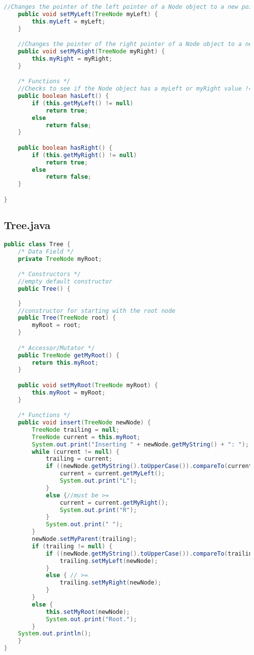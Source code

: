 \documentclass[letterpaper, 10pt,DIV=13]{scrartcl}
\numberwithin{equation}{section} %
\numberwithin{figure}{section} %
\numberwithin{table}{section} %
\begin{document}
\begin{lstlisting}[frame=single, language=java, breaklines]
    //Changes the pointer of the left pointer of a Node object to a new pointer to a node Object (or NULL)
    public void setMyLeft(TreeNode myLeft) {
        this.myLeft = myLeft;
    }

    //Changes the pointer of the right pointer of a Node object to a new pointer to a node Object (or NULL)
    public void setMyRight(TreeNode myRight) {
        this.myRight = myRight;
    }

    /* Functions */
    //Checks to see if the Node object has a myLeft or myRight value != null. Returns boolean depending on result.
    public boolean hasLeft() {
        if (this.getMyLeft() != null)
            return true;
        else
            return false;
    }

    public boolean hasRight() {
        if (this.getMyRight() != null)
            return true;
        else
            return false;
    }

}
\end{lstlisting}

\subsection{Tree.java}
\begin{lstlisting}[frame=single, language=java, breaklines]  
public class Tree {
    /* Data Field */
    private TreeNode myRoot;

    /* Constructors */
    //empty default constructor
    public Tree() {
        
    }
    //constructor for starting with the root node
    public Tree(TreeNode root) {
        myRoot = root;
    }

    /* Accessor/Mutator */
    public TreeNode getMyRoot() {
        return this.myRoot;
    }

    public void setMyRoot(TreeNode myRoot) {
        this.myRoot = myRoot;
    }

    /* Functions */
    public void insert(TreeNode newNode) {
        TreeNode trailing = null;
        TreeNode current = this.myRoot;
        System.out.print("Inserting " + newNode.getMyString() + ": ");
        while (current != null) {
            trailing = current;
            if ((newNode.getMyString().toUpperCase()).compareTo(current.getMyString().toUpperCase()) < 0) {
                current = current.getMyLeft();
                System.out.print("L");
            }
            else {//must be >=
                current = current.getMyRight();
                System.out.print("R");
            }
            System.out.print(" ");
        }
        newNode.setMyParent(trailing);
        if (trailing != null) {
            if ((newNode.getMyString().toUpperCase()).compareTo(trailing.getMyString().toUpperCase()) < 0) {
                trailing.setMyLeft(newNode);
            }
            else { // >=
                trailing.setMyRight(newNode);
            }
        }
        else {
            this.setMyRoot(newNode);
            System.out.print("Root.");
        }
    System.out.println();
    }
}
\end{lstlisting}
\end{document}
